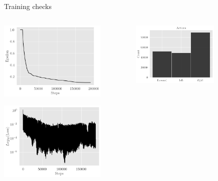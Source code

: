 \documentclass[bigger]{beamer}
\begin{document}
\begin{frame}[label={sec:orgb59c4e4}]{Training checks}
\begin{columns}
\begin{column}[c]{0.5\columnwidth}
\begin{center}
\includegraphics[width=0.8\textwidth]{img/exploration-rate.png}
\end{center}
\begin{center}
\includegraphics[width=0.8\textwidth]{img/loss.png}
\end{center}
\end{column}
\begin{column}[c]{0.5\columnwidth}
\begin{center}
\includegraphics[width=0.65\textwidth]{img/actions-distribution.png}

\end{center}
\end{column}
\end{columns}
\end{frame}
\end{document}
